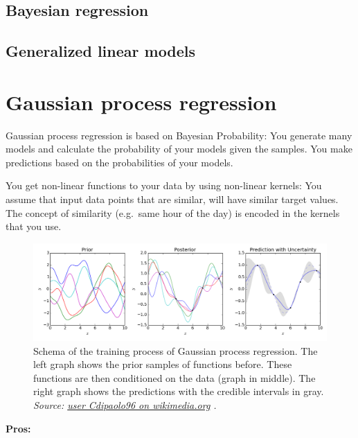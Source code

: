\documentclass[
]{book}
\begin{document}
\hypertarget{bayesian-regression}{%
\subsection{Bayesian regression}\label{bayesian-regression}}

\hypertarget{generalized-linear-models}{%
\subsection{Generalized linear models}\label{generalized-linear-models}}

\hypertarget{gaussian-process-regression}{%
\section{Gaussian process regression}\label{gaussian-process-regression}}

Gaussian process regression is based on Bayesian Probability: You
generate many models and calculate the probability of your models given
the samples. You make predictions based on the probabilities of your
models.

You get non-linear functions to your data by using non-linear kernels:
You assume that input data points that are similar, will have similar
target values. The concept of similarity (e.g.~same hour of the day) is
encoded in the kernels that you use.

\begin{figure}
\centering
\includegraphics{figures/Gaussian_Process_Regression.png}
\caption{Schema of the training process of Gaussian process regression. The
left graph shows the prior samples of functions before. These functions
are then conditioned on the data (graph in middle). The right graph
shows the predictions with the credible intervals in gray. \emph{Source:
\href{https://commons.wikimedia.org/wiki/File:Gaussian_Process_Regression.png}{user Cdipaolo96 on
wikimedia.org}
.}}
\end{figure}

\textbf{Pros:}
\end{document}
